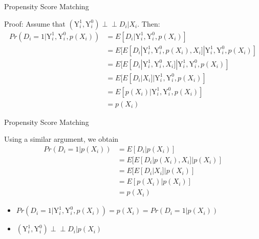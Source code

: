 \documentclass[dvipsnames,hyperref={pdfpagelabels=false}]{beamer}
\newcommand{\indep}{\perp\!\!\!\perp}
\begin{document}
\begin{frame}{Propensity Score Matching}

Proof: Assume that $ (\mathrm{Y}^{1}_{i},\mathrm{Y}^{0}_{i})\indep D_{i}|X_{i}$. Then:
	\begin{equation*}
	\begin{aligned}
	Pr(D_{i}=1|\mathrm{Y}^{1}_{i},\mathrm{Y}^{0}_{i},p(X_{i}))
	&= E[D_{i}|\mathrm{Y}^{1}_{i},\mathrm{Y}^{0}_{i},p(X_{i})]\\
	&= E[E[D_{i}|\mathrm{Y}^{1}_{i},\mathrm{Y}^{0}_{i},p(X_{i}),X_{i}]|\mathrm{Y}^{1}_{i},\mathrm{Y}^{0}_{i},p(X_{i})]\\
	&= E[E[D_{i}|\mathrm{Y}^{1}_{i},\mathrm{Y}^{0}_{i},X_{i}]|\mathrm{Y}^{1}_{i},\mathrm{Y}^{0}_{i},p(X_{i})]\\
	&= E[E[D_{i}|X_{i}]|\mathrm{Y}^{1}_{i},\mathrm{Y}^{0}_{i},p(X_{i})]\\
	&= E[p(X_{i})|\mathrm{Y}^{1}_{i},\mathrm{Y}^{0}_{i},p(X_{i})] \\
	&= p(X_{i})
	\end{aligned}
	\end{equation*}

\end{frame}


\begin{frame}{Propensity Score Matching}
	
    Using a similar argument, we obtain
	\begin{equation*}
		\begin{aligned}
			Pr(D_{i}=1|p(X_{i}))
			&= E[D_{i}|p(X_{i})] \\
			&= E[E[D_{i}|p(X_{i}),X_{i}]|p(X_{i})]\\
			&= E[E[D_{i}|X_{i}]|p(X_{i})]\\
			&= E[p(X_{i})|p(X_{i})] \\
			&= p(X_{i})
		\end{aligned}
	\end{equation*}
	\begin{itemize}
		\item[$\Rightarrow$] $Pr(D_{i}=1|\mathrm{Y}^{1}_{i},\mathrm{Y}^{0}_{i},p(X_{i}))=p(X_{i})=Pr(D_{i}=1|p(X_{i}))$
		\item[$\Rightarrow$] $(\mathrm{Y}^{1}_{i},\mathrm{Y}^{0}_{i})\indep D_{i}|p(X_{i})$
	\end{itemize}
\end{frame}
\end{document}
